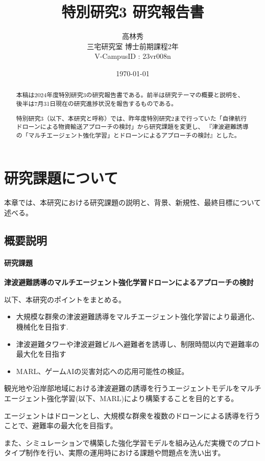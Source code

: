 \documentclass{article}[jsarticle]
\title{特別研究3 研究報告書}
\author{高林秀 \\ 三宅研究室 博士前期課程2年 \\ V-CampusID : 23vr008n}
\date{\today}
\begin{document}
\maketitle

\begin{abstract}
    \noindent
    本稿は2024年度特別研究3の研究報告書である。前半は研究テーマの概要と説明を、後半は7月31日現在の研究進捗状況を報告するものである。\par
    \noindent
    特別研究3（以下、本研究と呼称）では、昨年度特別研究2まで行っていた「自律航行ドローンによる物資輸送アプローチの検討」から研究課題を変更し、
    『津波避難誘導の「マルチエージェント強化学習」とドローンによるアプローチの検討』とした。\par 
    \noindent
\end{abstract}

\tableofcontents

\section{研究課題について}
本章では、本研究における研究課題の説明と、背景、新規性、最終目標について述べる。
\subsection{概要説明}
\paragraph{研究課題}
\begin{center}
    \textbf{津波避難誘導のマルチエージェント強化学習ドローンによるアプローチの検討}
\end{center}
以下、本研究のポイントをまとめる。
\begin{itemize}
    \item 大規模な群衆の津波避難誘導をマルチエージェント強化学習により最適化、機械化を目指す.
    \item 津波避難タワーや津波避難ビルへ避難者を誘導し、制限時間以内で避難率の最大化を目指す
    \item MARL、ゲームAIの災害対応への応用可能性の検証。
\end{itemize}
観光地や沿岸部地域における津波避難の誘導を行うエージェントモデルをマルチエージェント強化学習(以下、MARL)により構築することを目的とする。\par
エージェントはドローンとし、大規模な群衆を複数のドローンによる誘導を行うことで、避難率の最大化を目指す。\par
また、シミュレーションで構築した強化学習モデルを組み込んだ実機でのプロトタイプ制作を行い、実際の運用時における課題や問題点を洗い出す。
\end{document}

